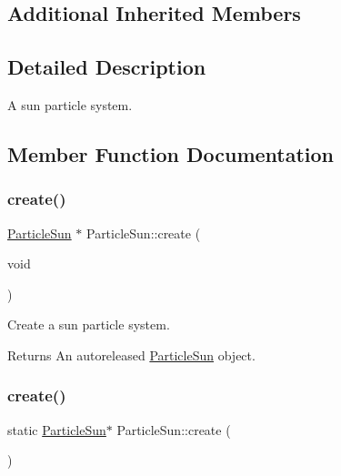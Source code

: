 \subsection*{Additional Inherited Members}


\subsection{Detailed Description}
A sun particle system. 

\subsection{Member Function Documentation}
\mbox{\label{classParticleSun_a0608c99c0c7fe36cf7c02c5dcd0286eb}} 
\subsubsection{\texorpdfstring{create()}{create()}\hspace{0.1cm}{\footnotesize\ttfamily [1/2]}}
{\footnotesize\ttfamily \hyperlink{classParticleSun}{Particle\+Sun} $\ast$ Particle\+Sun\+::create (\begin{DoxyParamCaption}\item[{void}]{ }\end{DoxyParamCaption})\hspace{0.3cm}{\ttfamily [static]}}

Create a sun particle system.

\begin{DoxyReturn}{Returns}
An autoreleased \hyperlink{classParticleSun}{Particle\+Sun} object. 
\end{DoxyReturn}
\mbox{\label{classParticleSun_a74ab317d60eb930da1608dcf2047d745}} 
\subsubsection{\texorpdfstring{create()}{create()}\hspace{0.1cm}{\footnotesize\ttfamily [2/2]}}
{\footnotesize\ttfamily static \hyperlink{classParticleSun}{Particle\+Sun}$\ast$ Particle\+Sun\+::create (\begin{DoxyParamCaption}{ }\end{DoxyParamCaption})\hspace{0.3cm}{\ttfamily [static]}}

